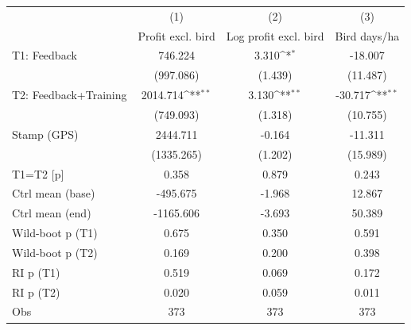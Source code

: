 {
\def\sym#1{\ifmmode^{#1}\else\(^{#1}\)\fi}
\begin{tabular}{l*{3}{c}}
\toprule
                    &\multicolumn{1}{c}{(1)}&\multicolumn{1}{c}{(2)}&\multicolumn{1}{c}{(3)}\\
                    &\multicolumn{1}{c}{Profit excl. bird}&\multicolumn{1}{c}{Log profit excl. bird}&\multicolumn{1}{c}{Bird days/ha}\\
\midrule
T1: Feedback        &     746.224         &       3.310\sym{*}  &     -18.007         \\
                    &   (997.086)         &     (1.439)         &    (11.487)         \\
T2: Feedback+Training&    2014.714\sym{**} &       3.130\sym{**} &     -30.717\sym{**} \\
                    &   (749.093)         &     (1.318)         &    (10.755)         \\
Stamp (GPS)         &    2444.711         &      -0.164         &     -11.311         \\
                    &  (1335.265)         &     (1.202)         &    (15.989)         \\
\midrule
T1=T2 [p]           &       0.358         &       0.879         &       0.243         \\
Ctrl mean (base)    &    -495.675         &      -1.968         &      12.867         \\
Ctrl mean (end)     &   -1165.606         &      -3.693         &      50.389         \\
Wild-boot p (T1)    &       0.675         &       0.350         &       0.591         \\
Wild-boot p (T2)    &       0.169         &       0.200         &       0.398         \\
RI p (T1)           &       0.519         &       0.069         &       0.172         \\
RI p (T2)           &       0.020         &       0.059         &       0.011         \\
Obs                 &         373         &         373         &         373         \\
\bottomrule
\end{tabular}
}
